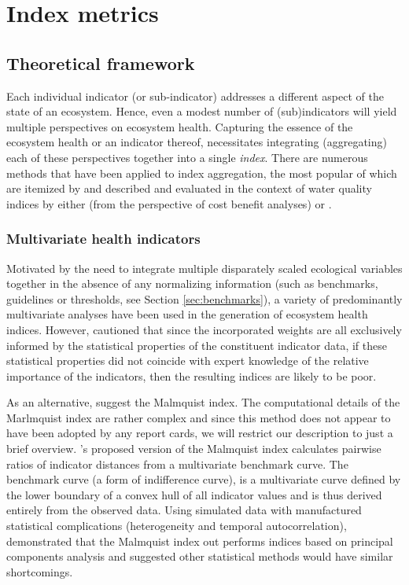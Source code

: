 \section{Index metrics}

\subsection{Theoretical framework}
 
Each individual indicator (or sub-indicator) addresses a different aspect of the state of an
ecosystem.  Hence, even a modest number of (sub)indicators will yield multiple perspectives on
ecosystem health.  Capturing the essence of the ecosystem health or an indicator thereof,
necessitates integrating (aggregating) each of these perspectives together into a single
\textit{index}.  There are numerous methods that have been applied to index aggregation, the most
popular of which are itemized by \citet{Fox-2013-2013} and described and evaluated in the context of
water quality indices by either \citet{Walsh-2012} (from the perspective of cost benefit analyses)
or \citet{Whittaker-2012}.

\subsubsection{Multivariate health indicators}

Motivated by the need to integrate multiple disparately scaled ecological variables together in the
absence of any normalizing information (such as benchmarks, guidelines or thresholds, see Section
\ref{sec:benchmarks}), a variety of predominantly multivariate analyses have been used in the
generation of ecosystem health indices.  However, \citet{Whittaker-2012} cautioned that since the
incorporated weights are all exclusively informed by the statistical properties of the constituent
indicator data, if these statistical properties did not coincide with expert knowledge of the
relative importance of the indicators, then the resulting indices are likely to be poor.

As an alternative, \citet{Whittaker-2012} suggest the Malmquist index.  The computational details of
the Marlmquist index are rather complex and since this method does not appear to have been adopted
by any report cards, we will restrict our description to just a brief overview.
\citet{Whittaker-2012}'s proposed version of the Malmquist index calculates pairwise ratios of
indicator distances from a multivariate benchmark curve.  The benchmark curve (a form of
indifference curve), is a multivariate curve defined by the lower boundary of a convex hull of all
indicator values and is thus derived entirely from the observed data.  Using simulated data with
manufactured statistical complications (heterogeneity and temporal autocorrelation),
\citet{Whittaker-2012} demonstrated that the Malmquist index out performs indices based on principal
components analysis and suggested other statistical methods would have similar shortcomings.

